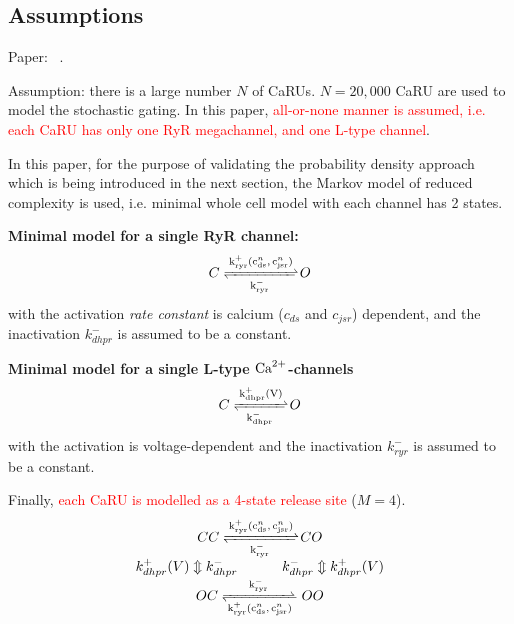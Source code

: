 

\subsection{Assumptions}
\label{sec:assumptions}


Paper: ~\citep{williams2007pda}.

Assumption: there is a large number $N$ of CaRUs. $N=20,000$ CaRU are
used to model the stochastic gating.  In this paper,
\textcolor{red}{all-or-none manner is assumed, i.e. each CaRU has only
  one RyR megachannel, and one L-type channel}.

In this paper, for the purpose of validating the probability density
approach which is being introduced in the next section, the Markov
model of reduced complexity is used, i.e. minimal whole cell model
with each channel has 2 states.

{\bf Minimal model for a single RyR channel:}
\begin{equation}
  \label{eq:161}
C \ce{<=>[k^+_{ryr}(c^n_{ds},c^n_{jsr})][k^-_{ryr}]} O  
\end{equation}
with the activation {\it rate constant} is calcium ($c_{ds}$ and
$c_{jsr}$) dependent, and the inactivation $k^-_{dhpr}$ is assumed to
be a constant.

{\bf Minimal model for a single L-type ${\text{Ca}^{2+}}$-channels}
\begin{equation}
  \label{eq:162}
C \ce{<=>[k^+_{dhpr}(V)][k^-_{dhpr}]} O    
\end{equation}
with the activation is voltage-dependent and the inactivation
$k^-_{ryr}$ is assumed to be a constant.

Finally,
\textcolor{red}{each  CaRU is modelled as a 4-state release
  site} ($M = 4$).
\begin{equation}
  \label{eq:163}
  \begin{array}{c}
      CC \ce{<=>[k^+_{ryr}(c^n_{ds},c^n_{jsr})][k^-_{ryr}]} CO \\
        k^+_{dhpr}(V) \Updownarrow  k^-_{dhpr}   
        \text{\hspace{10 mm}     } k^-_{dhpr} \Updownarrow  k^+_{dhpr}(V)  \\
      OC \ce{<=>[k^-_{ryr}][k^+_{ryr}(c^n_{ds},c^n_{jsr})]}OO\\
  \end{array}
\end{equation}

